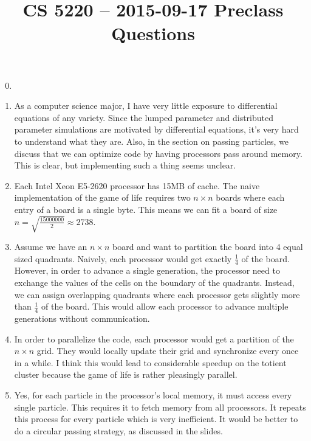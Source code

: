 \documentclass{hw}
\title{CS 5220 -- 2015-09-17 Preclass Questions}
\begin{document}
\maketitle{}

\begin{enumerate}
  \setcounter{enumi}{-1}
  \item

  \item
    As a computer science major, I have very little exposure to differential
    equations of any variety. Since the lumped parameter and distributed
    parameter simulations are motivated by differential equations, it's very
    hard to understand what they are. Also, in the section on passing
    particles, we discuss that we can optimize code by having processors pass
    around memory. This is clear, but implementing such a thing seems unclear.

  \item
    Each Intel Xeon E5-2620 processor has 15MB of cache. The naive
    implementation of the game of life requires two $n \times n$ boards where
    each entry of a board is a single byte. This means we can fit a board of
    size $n = \sqrt{\frac{15000000}{2}} \approx 2738$.

  \item
    Assume we have an $n \times n$ board and want to partition the board into 4
    equal sized quadrants. Naively, each processor would get exactly
    $\frac{1}{4}$ of the board. However, in order to advance a single
    generation, the processor need to exchange the values of the cells on the
    boundary of the quadrants. Instead, we can assign overlapping quadrants
    where each processor gets slightly more than $\frac{1}{4}$ of the board.
    This would allow each processor to advance multiple generations without
    communication.

  \item
    In order to parallelize the code, each processor would get a partition of
    the $n \times n$ grid. They would locally update their grid and synchronize
    every once in a while. I think this would lead to considerable speedup on
    the totient cluster because the game of life is rather pleasingly parallel.

  \item
    Yes, for each particle in the processor's local memory, it must access
    every single particle. This requires it to fetch memory from all
    processors. It repeats this process for every particle which is very
    inefficient. It would be better to do a circular passing strategy, as
    discussed in the slides.
\end{enumerate}
\end{document}
